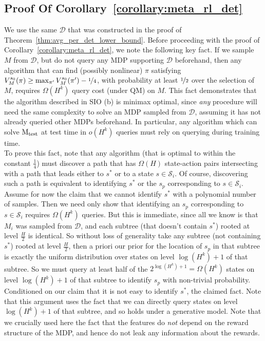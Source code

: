 \documentclass[11pt,twoside]{article}
\begin{document}
\subsection{Proof Of Corollary~\ref{corollary:meta_rl_det}}
\label{app:lower_corr_meta_det}
We use the same $\mathcal{D}$ that was constructed in the proof of Theorem~\ref{thm:avg_per_det_lower_bound}. Before proceeding with the proof of Corollary~\ref{corollary:meta_rl_det}, we note the following key fact. If we sample $M$ from $\mathcal{D}$, but do not query any MDP supporting $\mathcal{D}$ beforehand, then any algorithm that can find (possibly nonlinear) $\pi$ satisfying $V^{{s_0 }}_{{M }}({\pi}) \geq \max_{\pi'} V^{{s_0 }}_{{M }}({\pi'}) - \nicefrac{1}{4}$, with probability at least $\nicefrac{1}{2}$ over the selection of $M$, requires $\Omega(H^k)$ query cost (under QM) on $M$. This fact demonstrates that the algorithm described in SIO (b) is minimax optimal, since \emph{any} procedure will need the same complexity to solve an MDP sampled from $\mathcal{D}$, assuming it has not already queried other MDPs beforehand. In particular, any algorithm which can solve $\operatorname{M_{test}}$ at test time in $o(H^k)$ queries must rely on querying during training time. \\

To prove this fact, note that any algorithm (that is optimal to within the constant $\frac{1}{4}$) must discover a path that has $\Omega(H)$ state-action pairs intersecting with a path that leads either to $s^*$ or to a state $s \in \mathcal{S}_i$. Of course, discovering such a path is equivalent to identifying $s^*$ or the $s_p$ corresponding to $s \in \mathcal{S}_i$. Assume for now the claim that we cannot identify $s^*$ with a polynomial number of samples. Then we need only show that identifying an $s_p$ corresponding to $s \in \mathcal{S}_i$ requires $\Omega(H^k)$ queries. But this is immediate, since all we know is that $M_i$ was sampled from $\mathcal{D}$, and each subtree (that doesn't contain $s^*$) rooted at level $\frac{H}{2}$ is identical. So without loss of generality take any subtree (not containing $s^*$) rooted at level $\frac{H}{2}$, then a priori our prior for the location of $s_p$ in that subtree is exactly the uniform distribution over states on level $\log(H^k) + 1$ of that subtree. So we must query at least half of the $2^{\log(H^k) + 1} = \Omega(H^k)$ states on level $\log(H^k) + 1$ of that subtree to identify $s_p$ with non-trivial probability. Conditioned on our claim that it is not easy to identify $s^*$, the claimed fact. Note that this argument uses the fact that we can directly query states on level $\log(H^k) + 1$ of that subtree, and so holds under a generative model. Note that we crucially used here the fact that the features do \emph{not} depend on the reward structure of the MDP, and hence do not leak any information about the rewards. \\
\end{document}
